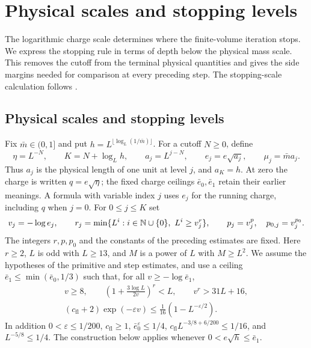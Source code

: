 \section{Physical scales and stopping levels}\label{sec:rg-flow}

The logarithmic charge scale determines where the finite-volume
iteration stops. We express the stopping rule in terms of depth below
the physical mass scale. This removes the cutoff from the terminal
physical quantities and gives the side margins needed for comparison
at every preceding step.
The stopping-scale calculation follows \cite[\S16.1]{QED3Master}.

\subsection{Physical scales and stopping levels}
\label{subsec:rgfl-scales}

Fix $\bar m\in(0,1]$ and put
$h=L^{\lfloor\log_L(1/\bar m)\rfloor}$.
For a cutoff $N\ge0$, define
\begin{equation}\label{eq:rgfl-physical-scales}
 \eta=L^{-N},\qquad K=N+\log_Lh,\qquad
 a_j=L^{j-N},\qquad e_j=e\sqrt{a_j},\qquad
 \mu_j=\bar m a_j.
\end{equation}
Thus $a_j$ is the physical length of one unit at
level $j$, and $a_K=h$.
At zero the charge is written $q=e\sqrt\eta$;
the fixed charge ceilings $\bar e_0,\bar e_1$ retain their
earlier meanings. A formula with variable index $j$
uses $e_j$ for the running charge, including $q$
when $j=0$.
For $0\le j\le K$ set
\[
 v_j=-\log e_j,\qquad
 r_j=\min\{L^i:i\in\mathbb N\cup\{0\},\ L^i\ge v_j^r\},
 \qquad p_j=v_j^p,\quad p_{0,j}=v_j^{p_0}.
\]
The integers $r,p,p_0$ and the constants of the
preceding estimates are fixed.
Here $r\ge2$, $L$ is odd with $L\ge13$, and $M$
is a power of $L$ with $M\ge L^2$.
We assume the hypotheses of the primitive and
step estimates, and use a ceiling
$\bar e_1\le\min(\bar e_0,1/3)$ such that, for all
$v\ge-\log\bar e_1$,
\begin{equation}\label{eq:rgfl-scale-smallness}
 \begin{gathered}
 v\ge8,\qquad
 \left(1+\frac{3\log L}{2v}\right)^r<L,\qquad
 v^r>31L+16,\\
 (c_{\mathrm{fl}}+2)\exp(-\varepsilon v)
               \le\frac1{16}(1-L^{-\varepsilon/2}).
 \end{gathered}
\end{equation}
In addition
$0<\varepsilon\le1/200$,
$c_{\mathrm{fl}}\ge1$,
$\bar e_0^\varepsilon\le1/4$,
$c_{\mathrm{fl}}L^{-3/8+6/200}\le1/16$, and
$L^{-5/8}\le1/4$.
The construction below applies whenever
$0<e\sqrt h\le\bar e_1$.

